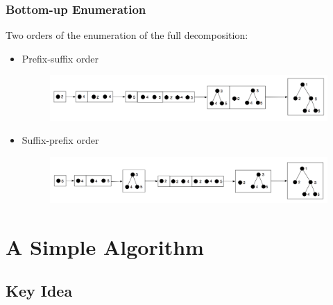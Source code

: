\documentclass{beamer}
\begin{document}
\begin{frame}
\frametitle{Bottom-up Enumeration}
Two orders of the enumeration of the full decomposition:
\begin{itemize}
\item Prefix-suffix order%
\begin{figure}
	\includegraphics[width=1.0\linewidth]{PrefixSuffix}
	\centering
\end{figure}
\item Suffix-prefix order%
\begin{figure}
	\includegraphics[width=1.0\linewidth]{SuffixPrefix}
	\centering
\end{figure}
\end{itemize}
\end{frame}
\section{A Simple Algorithm}
\subsection{Key Idea}
\begin{frame}

\end{frame}

\end{document}
